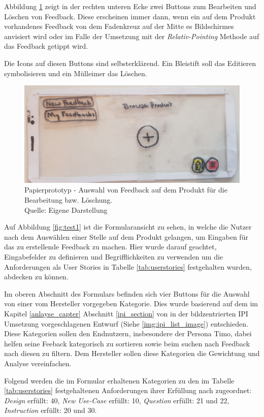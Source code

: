 Abbildung \ref{img:ppeditdelete} zeigt in der rechten unteren Ecke zwei Buttons zum Bearbeiten und Löschen von Feedback. Diese erscheinen immer dann, wenn ein auf dem Produkt vorhandenes Feedback von dem Fadenkreuz auf der Mitte es Bildschirmes anvisiert wird oder im Falle der Umsetzung mit der \textit{Relativ-Pointing} Methode auf das Feedback getippt wird. 

Die Icons auf diesen Buttons sind selbsterklärend. Ein Bleistift soll das Editieren symbolisieren und ein Mülleimer das Löschen.

\begin{figure}[H]
	\centering
	\includegraphics[width=.7\textwidth]{resources/conception/lowfi_edit_delete.jpg}
	\caption{Papierprototyp - Auswahl von Feedback auf dem Produkt für die Bearbeitung bzw. Löschung. \\Quelle: Eigene Darstellung}
	\label{img:ppeditdelete}
\end{figure}

Auf Abbildung \ref{fig:test1} ist die Formularansicht zu sehen, in welche die Nutzer nach dem Auswählen einer Stelle auf dem Produkt gelangen, um Eingaben für das zu erstellende Feedback zu machen. 
Hier wurde darauf geachtet, Eingabefelder zu definieren und Begrifflichkeiten zu verwenden um die Anforderungen als User Stories in Tabelle \ref{tab:userstories} festgehalten wurden, abdecken zu können.

Im oberen Abschnitt des Formulars befinden sich vier Buttons für die Auswahl von einer vom Hersteller vorgegeben Kategorie. 
Dies wurde basierend auf dem im Kapitel \ref{anlayse_capter} Abschnitt \ref{ipi_section} von \citeauthor{Kirschner2012} in der bildzentrierten IPI Umsetzung vorgeschlagenen Entwurf (Siehe \ref{img:ipi_list_image}) entschieden. Diese Kategorien sollen den Endnutzern, insbesondere der Persona Timo, dabei helfen seine Feeback kategorisch zu sortieren sowie beim suchen nach Feedback nach diesen zu filtern. 
Dem Hersteller sollen diese Kategorien die Gewichtung und Analyse vereinfachen.

Folgend werden die im Formular erhaltenen Kategorien zu den im Tabelle \ref{tab:userstories} festgehaltenen Anforderungen ihrer Erfüllung nach zugeordnet: \textit{Design} erfüllt: 40, \textit{New Use-Case} erfüllt: 10, \textit{Question} erfüllt: 21 und 22, \textit{Instruction} erfüllt: 20 und 30.


